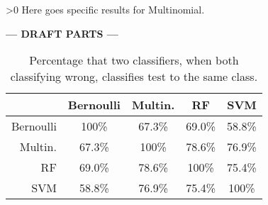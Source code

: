 \ifnum\printdraft>0
	Here goes specific results for Multinomial.
\else
\begin{center}
  	\textbf{--- DRAFT PARTS ---}
\end{center}
\fi

\begin{table}[h]\footnotesize
	\caption{Percentage that two classifiers, when both classifying wrong, classifies test to the same class.}
	\begin{tabular}{r|cccc}
	\ 		 	& Bernoulli & Multin. 	&RF 		&SVM \\ \hline
	Bernoulli 	&100\%   	&67.3\%   	&69.0\%   	&58.8\%\\
	Multin. 	&67.3\%  	&100\%   	&78.6\%   	&76.9\%\\
	RF 			&69.0\%   	&78.6\%  	&100\%   	&75.4\%\\
	SVM 		&58.8\%   	&76.9\%   	&75.4\%  	&100\%
	\end{tabular}
\end{table}
